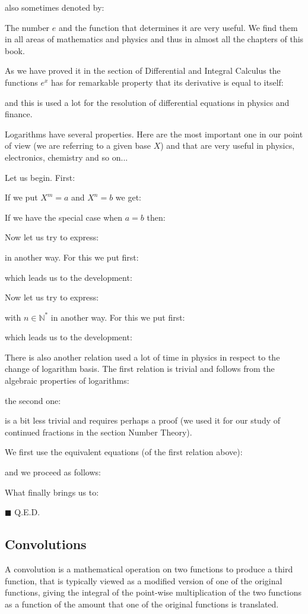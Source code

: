 	also sometimes denoted by:
	
	The number $e$ and the function that determines it are very useful. We find them in all areas of mathematics and physics and thus in almost all the chapters of this book.
	
	As we have proved it in the section of Differential and Integral Calculus the functions $e^x$ has for remarkable property that its derivative is equal to itself:
	
	and this is used a lot for the resolution of differential equations in physics and finance.
	
	Logarithms have several properties. Here are the most important one in our point of view (we are referring to a given base $X$) and that are very useful in physics, electronics, chemistry and so on...
	
	Let us begin. First:
	
	If we put $X^m=a$ and $X^n=b$ we get:
	
	If we have the special case when $a=b$ then:
	
	Now let us try to express:
	
	in another way. For this we put first:
	
	which leads us to the development:
	
	Now let us try to express:
	
	with $n\in \mathbb{N}^{*}$ in another way. For this we put first:
	
	which leads us to the development:
	
	There is  also another relation used a lot of time in physics in respect to the change of logarithm basis. The first relation is trivial and follows from the algebraic properties of logarithms:
	
	the second one:
	
	is a bit less trivial and requires perhaps a proof (we used it for our study of continued fractions in the section Number Theory).
	\begin{dem}
	We first use the equivalent equations (of the first relation above):
	
	and we proceed as follows:
	
	What finally brings us to:
	
	\begin{flushright}
		$\blacksquare$  Q.E.D.
	\end{flushright}
	\end{dem}
	
	\pagebreak
	\subsection{Convolutions}\label{convolution}
	A convolution is a mathematical operation on two functions to produce a third function, that is typically viewed as a modified version of one of the original functions, giving the integral of the point-wise multiplication of the two functions as a function of the amount that one of the original functions is translated.
	
